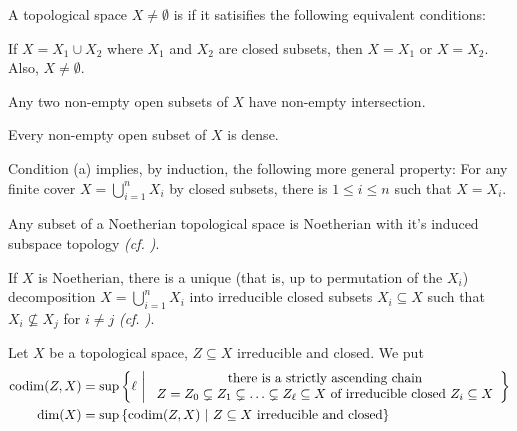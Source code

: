 \documentclass[a4paper,parskip=half,numbers=enddot, DIV=12]{scrreprt}
\begin{document}
\begin{defi}
	A topological space $X\not=\emptyset$ is  if it satisifies the following equivalent conditions:
	\begin{alphanumerate}
		\item If $X = X_1\cup X_2$ where $X_1$ and $X_2$ are closed subsets, then $X=X_1$ or $X=X_2$. Also, $X\neq\emptyset$.
		\item Any two non-empty open subsets of $X$ have non-empty intersection.
		\item Every non-empty open subset of $X$ is dense.
	\end{alphanumerate}
\end{defi}
Condition (a) implies, by induction, the following more general property: 
For any finite cover $X= \bigcup_{i=1}^n X_i$ by closed subsets, there is $1\leq i\leq n$ such that $X=X_i$.
\begin{prop}
	\begin{alphanumerate}
		\item 
		Any subset of a Noetherian topological space is Noetherian with it's induced subspace topology \emph{(cf. \cite[Remark~2.2.1]{alg1})}. 
		\item 
		If $X$ is Noetherian, there is a unique (that is, up to permutation of the $X_i$) decomposition $X = \bigcup_{i=1}^n X_i$ into irreducible closed subsets $X_i\subseteq X$ such that $X_i\not\subseteq X_j$ for $i\neq j$ \emph{(cf. \cite[Proposition~2.1.1]{alg1})}.
	\end{alphanumerate}
	
\end{prop}
\begin{defi}
	Let $X$ be a topological space, $Z\subseteq X$ irreducible and closed. We put 
	\begin{align*}
	\operatorname{codim}(Z,X) &= \sup\left\{\ell\ \middle|\  
	\begin{array}{c}
	\text{there is a strictly ascending chain}\\
	Z=Z_0 \subsetneq Z_1\subsetneq \ldots \subsetneq Z_\ell\subseteq X\text{ of irreducible closed }Z_i\subseteq X
	\end{array}\right\}\\
	\dim(X) &= \sup\left\{\operatorname{codim}(Z,X)\ \middle|\  Z\subseteq X \text{ irreducible and closed}\right\}
	\end{align*}
\end{defi}
\end{document}
